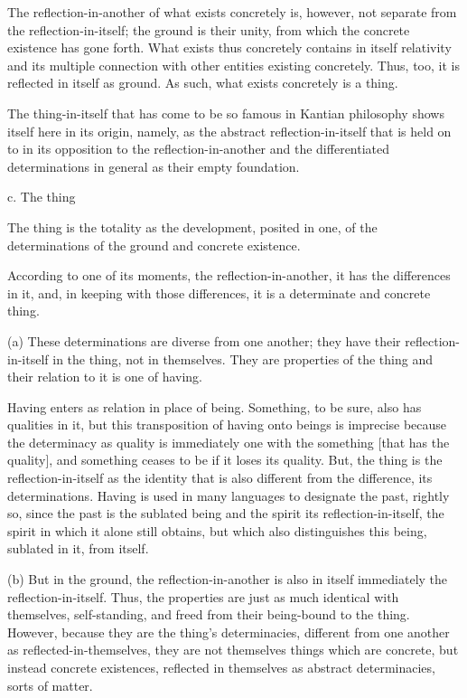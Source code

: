 The reflection-in-another of what exists concretely is,
however, not separate from the reflection-in-itself;
the ground is their unity, from which the concrete existence has gone forth.
What exists thus concretely contains in itself relativity and
its multiple connection with other entities existing concretely.
Thus, too, it is reflected in itself as ground.
As such, what exists concretely is a thing.

    The thing-in-itself that has come to be so famous in
    Kantian philosophy shows itself here in its origin, namely,
    as the abstract reflection-in-itself that is held on to
    in its opposition to the reflection-in-another and
    the differentiated determinations in general
    as their empty foundation.

c. The thing

The thing is the totality as the development, posited in one,
of the determinations of the ground and concrete existence.

According to one of its moments, the reflection-in-another,
it has the differences in it, and, in keeping with those differences,
it is a determinate and concrete thing.

(a) These determinations are diverse from one another;
they have their reflection-in-itself in the thing, not in themselves.
They are properties of the thing and their relation to it is one of having.

    Having enters as relation in place of being.
    Something, to be sure, also has qualities in it,
    but this transposition of having onto
    beings is imprecise because the determinacy as quality
    is immediately one with the something [that has the quality], and
    something ceases to be if it loses its quality.
    But, the thing is the reflection-in-itself as
    the identity that is also different from
    the difference, its determinations.
    Having is used in many languages to designate the past,
    rightly so, since the past is the sublated being and
    the spirit its reflection-in-itself,
    the spirit in which it alone still obtains,
    but which also distinguishes this being,
    sublated in it, from itself.

(b) But in the ground, the reflection-in-another is also in itself immediately
the reflection-in-itself. Thus, the properties are just as much identical with
themselves, self-standing, and freed from their being-bound to the thing.
However, because they are the thing's determinacies, different from one
another as reflected-in-themselves, they are not themselves things which
are concrete, but instead concrete existences, reflected in themselves as
abstract determinacies, sorts of matter.

